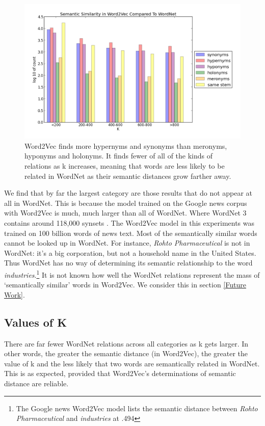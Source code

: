 \documentclass{article}
\begin{document}
\begin{figure}[!hb]
  \includegraphics[scale=.5]{All.png}
  \caption{Word2Vec finds more hypernyms and synonyms than meronyms, hyponyms and holonyms. It finds fewer of all of the kinds of relations as k increases, meaning that words are less likely to be related in WordNet as their semantic distances grow farther away.}
  \label{fig:all}
\end{figure}

We find that by far the largest category are those results that do not appear at all in WordNet. This is because the model trained on the Google news corpus with Word2Vec is much, much larger than all of WordNet. Where WordNet 3 contains around 118,000 synsets \cite{wordnet}. The Word2Vec model in this experiments was trained on 100 billion words \cite{Word2VecWebsite} of news text. Most of the semantically similar words cannot be looked up in WordNet. For instance, \textit{Rohto Pharmaceutical} is not in WordNet: it's a big corporation, but not a household name in the United States. Thus WordNet has no way of determining its semantic relationship to the word \textit{industries}.\footnote{The Google news Word2Vec model lists the semantic distance between \textit{Rohto Pharmaceutical} and \textit{industries} at .494} It is not known how well the WordNet relations represent the mass of `semantically similar' words in Word2Vec. We consider this in section \ref{Future Work}.

\subsection{Values of K} \label{val_k}
There are far fewer WordNet relations across all categories as k gets larger.  In other words, the greater the semantic distance (in Word2Vec), the greater the value of k and the less likely that two words are semantically related in WordNet. This is as expected, provided that Word2Vec's determinations of semantic distance are reliable.
\end{document}
